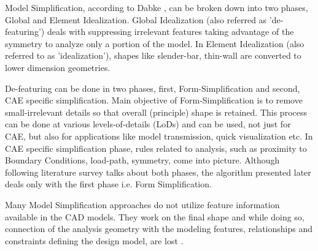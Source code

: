 \vspace{-.6cm}

	Model Simplification, according to Dabke \citep{Dabke1994}, can be broken down into two phases, Global and Element Idealization. Global Idealization (also referred as 'de-featuring') deals with suppressing irrelevant features taking advantage of the symmetry to analyze only a portion of the model. In Element Idealization (also referred to as 'idealization'), shapes like slender-bar, thin-wall are converted to lower dimension geometries.

De-featuring can be done in two phases, first, Form-Simplification and second, CAE specific simplification. Main objective of Form-Simplification is to remove small-irrelevant details so that overall (principle) shape is retained. This process can be done at various levels-of-details (LoDs) and can be used, not just for CAE, but also for applications like model transmission, quick visualization etc. In CAE specific simplification phase, rules related to analysis, such as proximity to Boundary Conditions, load-path, symmetry, come into picture. Although following literature survey talks about both phases, the algorithm presented later deals only with the first phase i.e. Form Simplification.

	Many Model Simplification  approaches do not utilize feature information available in the CAD models. They work on the final shape and while doing so, connection of the analysis geometry with the modeling features, relationships and constraints defining the design model, are lost \citep{Smit2011}.
